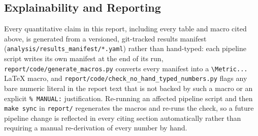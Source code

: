 \subsection{Explainability and Reporting}

Every quantitative claim in this report, including every table and macro cited above, is generated from a versioned, git-tracked results manifest (\texttt{analysis/results\_manifest/*.yaml}) rather than hand-typed: each pipeline script writes its own manifest at the end of its run, \texttt{report/code/generate\_macros.py} converts every manifest into a \texttt{\textbackslash Metric...} LaTeX macro, and \texttt{report/code/check\_no\_hand\_typed\_numbers.py} flags any bare numeric literal in the report text that is not backed by such a macro or an explicit \texttt{\% MANUAL:} justification. Re-running an affected pipeline script and then \texttt{make sync} in \texttt{report/} regenerates the macros and re-runs the check, so a future pipeline change is reflected in every citing section automatically rather than requiring a manual re-derivation of every number by hand.
